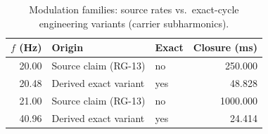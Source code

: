 \begin{table}[H]\centering
\caption{Modulation families: source rates vs.\ exact-cycle engineering variants (carrier subharmonics).}\label{tab:modfam}
\small
\begin{tabular}{@{}r l l r@{}}\toprule $f$ (\si{\hertz}) & Origin & Exact & Closure (\si{\milli\second}) \\ \midrule
20.00 & Source claim (RG-13) & no & 250.000 \\
20.48 & Derived exact variant & yes & 48.828 \\
21.00 & Source claim (RG-13) & no & 1000.000 \\
40.96 & Derived exact variant & yes & 24.414 \\
\bottomrule\end{tabular}\end{table}
